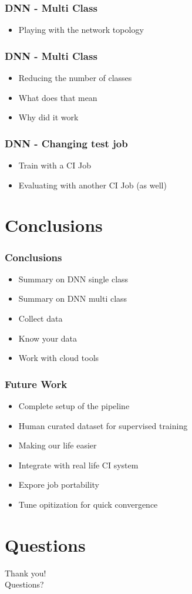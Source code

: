 \documentclass[aspectratio=169,11pt,hyperref={colorlinks=true}]{beamer}
\begin{document}
\begin{frame}
    \frametitle{DNN - Multi Class}
    \begin{itemize}
        \item{Playing with the network topology}
    \end{itemize}
\end{frame}

\begin{frame}
    \frametitle{DNN - Multi Class}
    \begin{itemize}
        \item{Reducing the number of classes}
        \item{What does that mean}
        \item{Why did it work}
    \end{itemize}
\end{frame}

\begin{frame}
    \frametitle{DNN - Changing test job}
    \begin{itemize}
        \item{Train with a CI Job}
        \item{Evaluating with another CI Job (as well)}
    \end{itemize}
\end{frame}

\section{Conclusions}
\begin{frame}
  \frametitle{Conclusions}
  \begin{itemize}
      \item{Summary on DNN single class}
      \item{Summary on DNN multi class}
      \item{Collect data}
      \item{Know your data}
      \item{Work with cloud tools}
  \end{itemize}
\end{frame}

\begin{frame}
  \frametitle{Future Work}
  \begin{itemize}
      \item{Complete setup of the pipeline}
      \item{Human curated dataset for supervised training}
      \item{Making our life easier}
      \item{Integrate with real life CI system}
      \item{Expore job portability}
      \item{Tune opitization for quick convergence}
  \end{itemize}
\end{frame}

\section{Questions}
\begin{frame}[c]
    \begin{center}
        \Huge Thank you!\\Questions?
    \end{center}
\end{frame}
\end{document}
